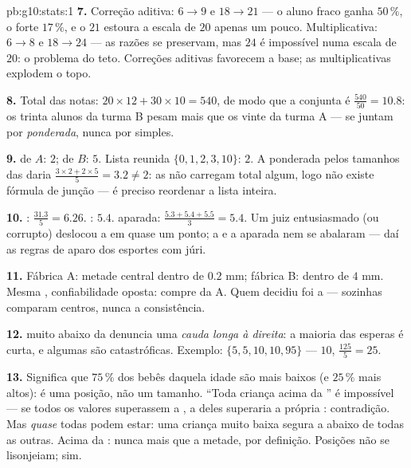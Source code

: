 \begin{solution}{pb:g10:stats:1}
\textbf{7.} Correção aditiva: $6 \to 9$ e $18 \to 21$ --- o
aluno fraco ganha $50\,\%$, o forte $17\,\%$, e o $21$ estoura
a escala de $20$ apenas um pouco. Multiplicativa: $6 \to 8$ e
$18 \to 24$ --- as razões se preservam, mas $24$ é impossível
numa escala de $20$: o problema do teto. Correções aditivas
favorecem a base; as multiplicativas explodem o topo.

\textbf{8.} Total das notas: $20 \times 12 + 30 \times 10 =
540$, de modo que a  conjunta é $\frac{540}{50} = 10.8$:
os trinta alunos da turma B pesam mais que os vinte da turma A
---  se juntam por  \emph{ponderada}, nunca por
 simples.

\textbf{9.}  de $A$: $2$; de $B$: $5$. Lista reunida
$\{0, 1, 2, 3, 10\}$:  $2$. A  ponderada pelos
tamanhos das  daria
$\frac{3 \times 2 + 2 \times 5}{5} = 3.2 \neq 2$: as 
não carregam total algum, logo não existe fórmula de junção ---
é preciso reordenar a lista inteira.

\textbf{10.} : $\frac{31.3}{5} = 6.26$. : $5.4$.
 aparada: $\frac{5.3 + 5.4 + 5.5}{3} = 5.4$. Um juiz
entusiasmado (ou corrupto) deslocou a  em quase um ponto;
a  e a  aparada nem se abalaram --- daí as regras
de aparo dos esportes com júri.

\textbf{11.} Fábrica A: metade central dentro de $0.2$ mm;
fábrica B: dentro de $4$ mm. Mesma , confiabilidade
oposta: compre da A. Quem decidiu foi a 
---  sozinhas comparam centros, nunca a consistência.

\textbf{12.}  muito abaixo da  denuncia uma
\emph{cauda longa à direita}: a maioria das esperas é curta, e
algumas são catastróficas. Exemplo: $\{5, 5, 10, 10, 95\}$ ---
 $10$,  $\frac{125}{5} = 25$.

\textbf{13.} Significa que $75\,\%$ dos bebês daquela idade são
mais baixos (e $25\,\%$ mais altos): é uma posição, não um
tamanho. ``Toda criança acima da '' é impossível --- se
todos os valores superassem a , a  deles superaria a
própria : contradição. Mas \emph{quase} todas podem estar:
uma criança muito baixa segura a  abaixo de todas as
outras. Acima da \emph{}: nunca mais que a metade, por
definição. Posições não se lisonjeiam;  sim.


\end{solution}
